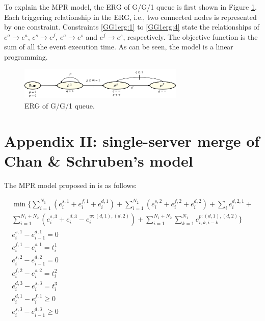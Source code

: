 \documentclass[]{interact}
\theoremstyle{plain}%
\theoremstyle{definition}
\theoremstyle{remark}
\begin{document}
To explain the MPR model, the ERG of G/G/1 queue is first shown in Figure \ref{fig:ERG_GG1}. Each triggering relationship in the ERG, i.e., two connected nodes is represented by one constraint. Constraints \eqref{GG1erg:1} to \eqref{GG1erg:4} state the relationships of $e^a \rightarrow e^a$, $e^s\rightarrow e^f$, $e^a\rightarrow e^s$ and $e^f\rightarrow e^s$, respectively. The objective function is the sum of all the event execution time. As can be seen, the model is a linear programming. 

\begin{figure}[h]
	\centering
	\includegraphics[width=0.7\textwidth]{Figures/ERG_GG1.png}
	\caption{ERG of G/G/1 queue.}
	\label{fig:ERG_GG1}
\end{figure}

\section*{Appendix II: single-server merge of Chan \& Schruben's model}

The MPR model proposed in \cite{chan2008optimization} is as follows:

\begin{eqnarray}
\min\{\sum_{i=1}^{N_1} (e^{s,1}_i+e^{f,1}_{i}+e^{d,1}_{i})+\sum_{i=1}^{N_2}(e^{s,2}_i+e^{f,2}_{i}+e^{d,2}_{i}) + \sum_{i}^{} e^{d,2,1}_{i}+\nonumber\\
\sum_{i=1}^{N_1+N_2}(e^{s,3}_i+e^{d,3}_{i}-e^{w:(d,1),(d,2)}_i) +\sum_{i=1}^{N_1+N_2}\sum_{k=1}^{N_1} e^{p:(d,1),(d,2)}_{i,k,i-k}\}\nonumber\\
e^{s,1}_i - e^{d,1}_{i-1} = 0\label{MergeErg:1} \\
e^{f,1}_{i} - e^{s,1}_{i} = t^{1}_i\\
e^{s,2}_i - e^{d,2}_{i-1} = 0\\
e^{f,2}_{i} - e^{s,2}_{i} = t^{2}_i\\
e^{d,3}_{i} - e^{s,3}_{i} = t^{3}_i\\
e^{d,1}_{i} - e^{f,1}_{i} \ge 0\label{MergeErg:6} \\
e^{s,3}_{i} - e^{d,3}_{i-1} \ge 0\label{MergeErg:7} 
\end{eqnarray}
\end{document}
